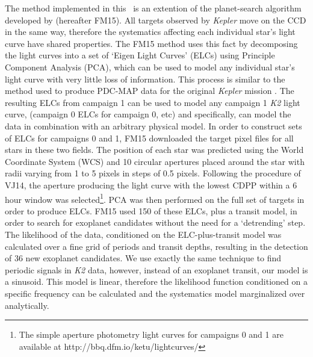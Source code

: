 \documentclass[useAMS, usenatbib, preprint, 12pt]{aastex}
\begin{document}
The method implemented in this \article\ is an extention of the planet-search
algorithm developed by \citet{Foreman-Mackey2015} (hereafter FM15).
All targets observed by {\it Kepler} move on the CCD in the same way,
therefore the systematics affecting each individual star's light curve have
shared properties.
The FM15 method uses this fact by decomposing the light curves into a set
of `Eigen Light Curves' (ELCs) using Principle Component Analysis (PCA), which
can be used to model any individual star's light curve with very little loss
of information.
This process is similar to the method used to produce PDC-MAP data for the
original {\it Kepler} mission \citep[][]{Stumpe2012, Smith2012}.
The resulting ELCs from campaign 1 can be used to model any campaign 1 {\it
K2} light curve, (campaign 0 ELCs for campaign 0, etc) and specifically, can
model the data in combination with an arbitrary physical model.
In order to construct sets of ELCs for campaigns 0 and 1, FM15 downloaded the
target pixel files for all stars in these two fields.
The position of each star was predicted using the World Coordinate System (WCS)
and 10 circular apertures placed around the star with radii varying from 1 to
5 pixels in steps of 0.5 pixels.
Following the procedure of VJ14, the aperture producing the
light curve with the lowest CDPP within a 6 hour window
\citep{Christiansen2012} was selected\footnote{The simple aperture photometry
light curves for campaigns 0 and 1 are available at
http://bbq.dfm.io/ketu/lightcurves/}.
PCA was then performed on the full set of targets in order to produce ELCs.
FM15 used 150 of these ELCs, plus a transit model, in order to
search for exoplanet candidates without the need for a `detrending' step.
The likelihood of the data, conditioned on the ELC-plus-transit
model was calculated over a fine grid of periods and transit depths, resulting
in the detection of 36 new exoplanet candidates.
We use exactly the same technique to find periodic signals in {\it K2} data,
however, instead of an exoplanet transit, our model is a sinusoid.
This model is linear, therefore the likelihood function conditioned on
a specific frequency can be calculated and the systematics model marginalized
over analytically.
\end{document}
